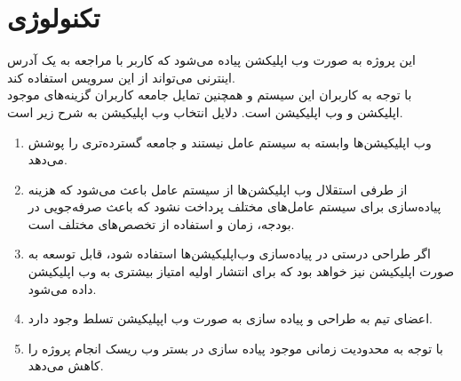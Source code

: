 \section{تکنولوژی}
این پروژه به صورت وب اپلیکشن پیاده می‌شود که کاربر با مراجعه به یک آدرس اینترنی می‌تواند از این سرویس استفاده کند.\\
با توجه به کاربران این سیستم و همچنین تمایل جامعه کاربران گزینه‌های موجود اپلیکشن‌ و وب اپلیکیشن‌ است.
دلایل انتخاب وب اپلیکیشن به شرح زیر است.
\begin{enumerate}
    \item
    وب اپلیکیشن‌ها وابسته به سیستم عامل نیستند و جامعه گسترده‌تری را پوشش 
    می‌دهد.
    \item
    از طرفی استقلال وب اپلیکشن‌ها از سیستم عامل باعث می‌شود که هزینه پیاده‌سازی برای سیستم عامل‌های مختلف پرداخت نشود که باعث صرفه‌جویی در بودجه، زمان و استفاده از تخصص‌های مختلف است.
	\item
	اگر طراحی درستی در پیاده‌سازی وب‌اپلیکیشن‌ها استفاده شود، قابل توسعه به صورت اپلیکیشن نیز خواهد بود که برای انتشار اولیه امتیاز بیشتری به وب اپلیکیشن داده می‌شود.
	\item
	اعضای تیم به طراحی و پیاده سازی به صورت وب اپپلیکیشن تسلط وجود دارد.
	\item 
	با توجه به محدودیت زمانی موجود پیاده سازی در بستر وب ریسک انجام پروژه را کاهش می‌دهد.
\end{enumerate}

